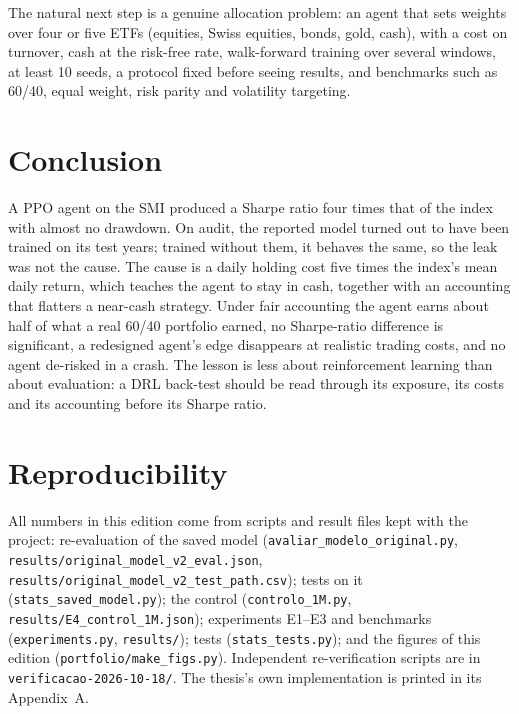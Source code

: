 \documentclass[11pt,a4paper]{article}
\begin{document}
The natural next step is a genuine allocation problem: an agent that sets weights over four or five ETFs (equities, Swiss equities, bonds, gold, cash), with a cost on turnover, cash at the risk-free rate, walk-forward training over several windows, at least 10 seeds, a protocol fixed before seeing results, and benchmarks such as 60/40, equal weight, risk parity \citep{maillard2010} and volatility targeting.

\section{Conclusion}

A PPO agent on the SMI produced a Sharpe ratio four times that of the index with almost no drawdown. On audit, the reported model turned out to have been trained on its test years; trained without them, it behaves the same, so the leak was not the cause. The cause is a daily holding cost five times the index's mean daily return, which teaches the agent to stay in cash, together with an accounting that flatters a near-cash strategy. Under fair accounting the agent earns about half of what a real 60/40 portfolio earned, no Sharpe-ratio difference is significant, a redesigned agent's edge disappears at realistic trading costs, and no agent de-risked in a crash. The lesson is less about reinforcement learning than about evaluation: a DRL back-test should be read through its exposure, its costs and its accounting before its Sharpe ratio.

\section*{Reproducibility}
\small
All numbers in this edition come from scripts and result files kept with the project: re-evaluation of the saved model (\texttt{avaliar\_modelo\_original.py}, \texttt{results/original\_model\_v2\_eval.json}, \texttt{results/original\_model\_v2\_test\_path.csv}); tests on it (\texttt{stats\_saved\_model.py}); the control (\texttt{controlo\_1M.py}, \texttt{results/E4\_control\_1M.json}); experiments E1--E3 and benchmarks (\texttt{experiments.py}, \texttt{results/}); tests (\texttt{stats\_tests.py}); and the figures of this edition (\texttt{portfolio/make\_figs.py}). Independent re-verification scripts are in \texttt{verificacao-2026-10-18/}. The thesis's own implementation is printed in its Appendix~A.
\end{document}
